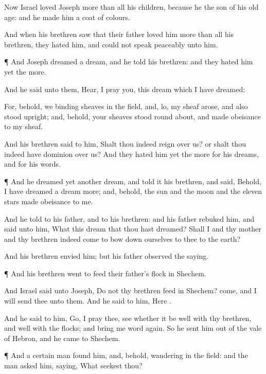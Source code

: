 {Now
Israel
loved
Joseph more than all his
children, because he
{} the
son of his old
age: and he
made him a
coat of
{}
colours.

And when his
brethren
saw that their
father
loved him more than all his
brethren, they
hated him, and
could not
speak
peaceably unto him.


\par }{\PP {}¶ And
Joseph
dreamed a
dream, and he
told
{} his
brethren: and they
hated him yet the
more.

And he
said unto them,
Hear, I pray you, this
dream which I have
dreamed:

For, behold, we
{}
binding
sheaves in the
field, and, lo, my
sheaf
arose, and also stood
upright; and, behold, your
sheaves stood round
about, and made
obeisance to my
sheaf.

And his
brethren
said to him, Shalt thou
indeed
reign over us? or shalt thou
indeed have
dominion over us? And they
hated him yet the
more for his
dreams, and for his
words.


\par }{\PP {}¶ And he
dreamed yet
another
dream, and
told it his
brethren, and
said, Behold, I have
dreamed a
dream more; and, behold, the
sun and the
moon and the
eleven
stars made
obeisance to me.

And he
told
{} to his
father, and to his
brethren: and his
father
rebuked him, and
said unto him, What
{} this
dream that thou hast
dreamed? Shall I and thy
mother and thy
brethren
indeed
come to bow
down ourselves to thee to the
earth?

And his
brethren
envied him; but his
father
observed the
saying.


\par }{\PP {}¶ And his
brethren
went to
feed their
father’s
flock in
Shechem.

And
Israel
said unto
Joseph, Do not thy
brethren
feed
{} in
Shechem?
come, and I will send
thee unto them. And he
said to him, Here
{}.

And he
said to him,
Go, I pray thee,
see whether it be
well with thy
brethren, and
well with the
flocks; and
bring me
word
again. So he
sent him out of the
vale of
Hebron, and he
came to
Shechem.


\par }{\PP {}¶ And a certain
man found
him, and, behold,
{}
wandering in the
field: and the
man asked
him,
saying, What
seekest thou?

}
